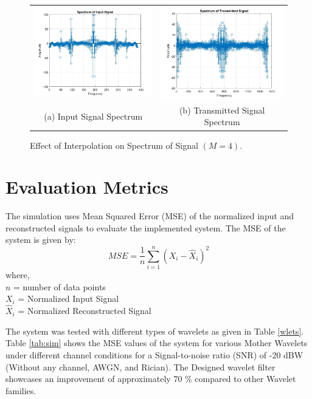 \begin{figure}[htpb]
\centering
\begin{tabular}{cc}
  \includegraphics[width=80mm]{Input_Spectrum.jpg} & \includegraphics[width=80mm]{Transmitted_Spectrum.jpg} \\
(a) Input Signal Spectrum  & (b) Transmitted Signal Spectrum  \\[8pt]
\end{tabular}
\caption{Effect of Interpolation on Spectrum of Signal $(M = 4)$.}
\label{spec}
\end{figure}

\section{Evaluation Metrics}
The simulation uses Mean Squared Error (MSE) of the normalized input and reconstructed signals to evaluate the implemented system. The MSE of the system is given by: 
\[
MSE = \frac{1}{n}\sum_{i=1}^{n}(X_i-\hat{X}_i)^2
\]
where, \\
${n}$ = number of data points \\
$X_{i}$ = Normalized Input Signal \\
$\hat{X}_{i}$ = Normalized Reconstructed Signal

\newpage
The system was tested with different types of wavelets as given in Table \ref{wlets}. Table \ref{tab:sim} shows the MSE values of the system for various Mother Wavelets under different channel conditions for a Signal-to-noise ratio (SNR) of -20 dBW (Without any channel, AWGN, and Rician). The Designed wavelet filter showcases an improvement of approximately 70 \% compared to other Wavelet families.

